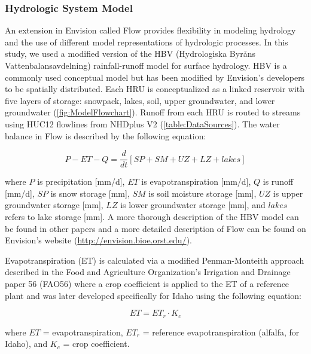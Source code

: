 \documentclass[water,article,submit,moreauthors,pdftex,10pt,a4paper]{mdpi}
\theoremstyle{mdpi}
\newcounter{ex}
\newcounter{re}
\theoremstyle{mdpidefinition}
\begin{document}
\subsubsection{Hydrologic System Model}

An extension in Envision called Flow provides flexibility in modeling hydrology and the use of different model representations of hydrologic processes. In this study, we used a modified version of the HBV (Hydrologiska Byr\r{a}ns Vattenbalansavdelning) rainfall-runoff model \citep{Bergstrom:1976tr} for surface hydrology. HBV is a commonly used conceptual model \citep{Seibert:2000wi,Woodsmith:2007vz,Abebe:2010to,Bergstrom:2015ck} but has been modified by Envision’s developers to be spatially distributed. Each HRU is conceptualized as a linked reservoir with five layers of storage: snowpack, lakes, soil, upper groundwater, and lower groundwater (\cref{fig:ModelFlowchart}). Runoff from each HRU is routed to streams using HUC12 flowlines from NHDplus V2 (\cref{table:DataSources}). The water balance in Flow is described by the following equation:

\begin{equation}
P - ET - Q = \frac{d}{dt}\left[SP + SM + UZ + LZ + lakes\right]
\end{equation}

where $P$ is precipitation [mm/d], $ET$ is evapotranspiration [mm/d], $Q$ is runoff [mm/d], $SP$ is snow storage [mm], $SM$ is soil moisture storage [mm], $UZ$ is upper groundwater storage [mm], $LZ$ is lower groundwater storage [mm], and $lakes$ refers to lake storage [mm]. A more thorough description of the HBV model can be found in other papers \citep{Seibert:1999vg,Bergstrom:2015ck} and a more detailed description of Flow can be found on Envision’s website (\href{http://envision.bioe.orst.edu/}{http://envision.bioe.orst.edu/}).

Evapotranspiration (ET) is calculated via a modified Penman-Monteith approach described in the Food and Agriculture Organization’s Irrigation and Drainage paper 56 (FAO56) where a crop coefficient is applied to the ET of a reference plant \citep{Allen:vn} and was later developed specifically for Idaho \citep{Allen:2007ta} using the following equation:

\begin{equation}
ET = ET_r \cdot K_c
\end{equation}

where $ET$ = evapotranspiration, $ET_r$ = reference evapotranspiration (alfalfa, for Idaho), and $K_c$ = crop coefficient.
\end{document}
